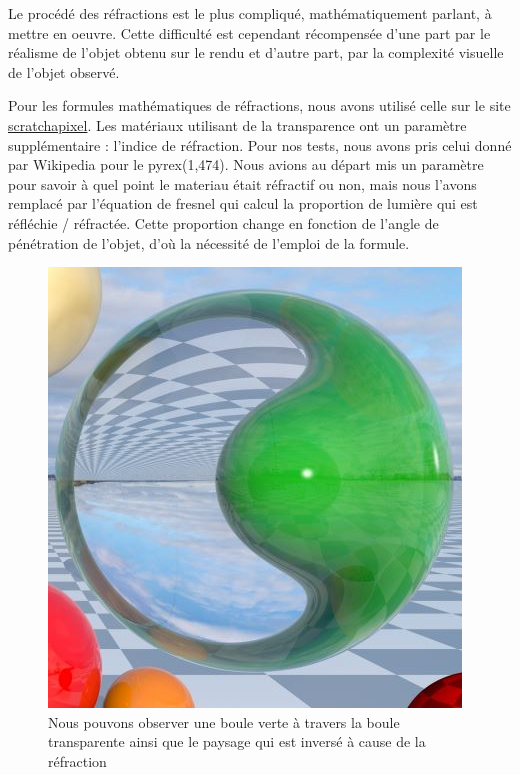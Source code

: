 Le procédé des réfractions est le plus compliqué, mathématiquement parlant, à mettre en oeuvre. Cette difficulté est cependant récompensée d'une part par le réalisme de l'objet obtenu sur le rendu et d'autre part, par la complexité visuelle de l'objet observé.

Pour les formules mathématiques de réfractions, nous avons utilisé celle sur le site \href{https://www.scratchapixel.com/lessons/3d-basic-rendering/introduction-to-shading/reflection-refraction-fresnel}{scratchapixel}.
Les matériaux utilisant de la transparence ont un paramètre supplémentaire : l'indice de réfraction. Pour nos tests, nous avons pris celui donné par Wikipedia pour le pyrex(1,474). Nous avions au départ mis un paramètre pour savoir à quel point le materiau était réfractif ou non, mais nous l'avons remplacé par l'équation de fresnel qui calcul la proportion de lumière qui est réfléchie / réfractée. Cette proportion change en fonction de l'angle de pénétration de l'objet, d'où la nécessité de l'emploi de la formule.

\begin{figure}[h]
   \begin{center}
       \includegraphics[scale=0.8]{img/rt/refractions.jpg}
   \end{center}
   \caption{Nous pouvons observer une boule verte à travers la boule transparente ainsi que le paysage qui est inversé à cause de la réfraction}
\end{figure}
